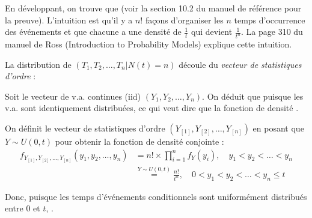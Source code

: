 \documentclass[10pt, french]{article}
\begin{document}
\begin{multicols*}{2}
\bigskip


En développant, on trouve que  (voir la section 10.2 du manuel de référence pour la preuve). L'intuition est qu'il y a $n!$ façons d'organiser les $n$ temps d'occurrence des événements et que chacune a une densité de $\frac{1}{t}$ qui devient $\frac{1}{t^{n}}$. La page 310 du manuel de Ross (Introduction to Probability Models) explique cette intuition.

\bigskip

La distribution de $(T_{1}, T_{2}, \dots, T_{n} | N(t)	=	n)$ découle du \textit{vecteur de statistiques d'ordre} : 

\begin{definitionNOHFILLsub}
Soit le vecteur de v.a. continues (iid) $(Y_{1}, Y_{2}, \dots, Y_{n})$. On déduit que puisque les v.a. sont identiquement distribuées,  ce qui veut dire que la fonction de densité . 

\bigskip

On définit le vecteur de statistiques d'ordre $(Y_{[1]}, Y_{[2]}, \dots, Y_{[n]})$ en posant que $Y \sim U(0, t)$ pour obtenir la fonction de densité conjointe :
\begin{align*}
	f_{Y_{[1]}, Y_{[2]}, \dots, Y_{[n]}}(y_{1}, y_{2}, \dots, y_{n})	
	&=	n! \times \prod_{i = 1}^{n} f_{Y}(y_{i}), \quad	y_{1}	<	y_{2}	<	\dots	<	y_{n}	\\
	&\overset{Y \sim U(0, t)}{=}	\frac{n!}{t^{n}}, \quad 0	<	y_{1}	<	y_{2}	<	\dots	<	y_{n}	\leq		t
\end{align*}
\end{definitionNOHFILLsub}

Donc, puisque les temps d'événements conditionnels sont uniformément distribués entre $0$ et $t$, .


\end{multicols*}
\end{document}
